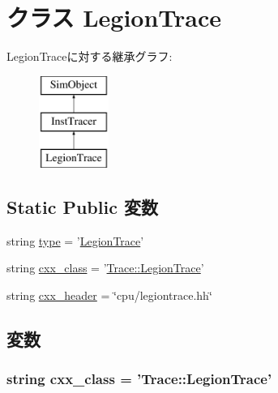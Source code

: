 \hypertarget{classLegionTrace_1_1LegionTrace}{
\section{クラス LegionTrace}
\label{classLegionTrace_1_1LegionTrace}
}
LegionTraceに対する継承グラフ:\begin{figure}[H]
\begin{center}
\leavevmode
\includegraphics[height=3cm]{classLegionTrace_1_1LegionTrace}
\end{center}
\end{figure}
\subsection*{Static Public 変数}
\begin{DoxyCompactItemize}
\item 
string \hyperlink{classLegionTrace_1_1LegionTrace_acce15679d830831b0bbe8ebc2a60b2ca}{type} = '\hyperlink{classLegionTrace_1_1LegionTrace}{LegionTrace}'
\item 
string \hyperlink{classLegionTrace_1_1LegionTrace_a58cd55cd4023648e138237cfc0822ae3}{cxx\_\-class} = '\hyperlink{classTrace_1_1LegionTrace}{Trace::LegionTrace}'
\item 
string \hyperlink{classLegionTrace_1_1LegionTrace_a17da7064bc5c518791f0c891eff05fda}{cxx\_\-header} = \char`\"{}cpu/legiontrace.hh\char`\"{}
\end{DoxyCompactItemize}


\subsection{変数}
\hypertarget{classLegionTrace_1_1LegionTrace_a58cd55cd4023648e138237cfc0822ae3}{
\subsubsection[{cxx\_\-class}]{\setlength{\rightskip}{0pt plus 5cm}string {\bf cxx\_\-class} = '{\bf Trace::LegionTrace}'}}
\label{classLegionTrace_1_1LegionTrace_a58cd55cd4023648e138237cfc0822ae3}


